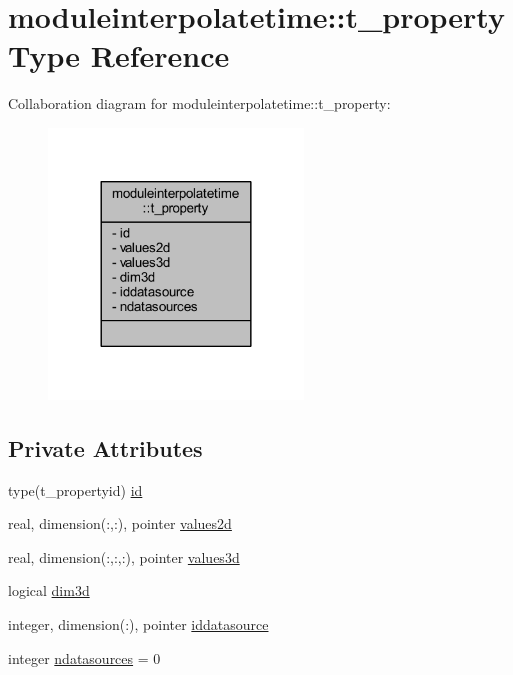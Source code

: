 \hypertarget{structmoduleinterpolatetime_1_1t__property}{}\section{moduleinterpolatetime\+:\+:t\+\_\+property Type Reference}
\label{structmoduleinterpolatetime_1_1t__property}


Collaboration diagram for moduleinterpolatetime\+:\+:t\+\_\+property\+:\nopagebreak
\begin{figure}[H]
\begin{center}
\leavevmode
\includegraphics[width=192pt]{structmoduleinterpolatetime_1_1t__property__coll__graph}
\end{center}
\end{figure}
\subsection*{Private Attributes}
\begin{DoxyCompactItemize}
\item 
type(t\+\_\+propertyid) \mbox{\hyperlink{structmoduleinterpolatetime_1_1t__property_a9667efafac25946f4c15ce9c43508b29}{id}}
\item 
real, dimension(\+:,\+:), pointer \mbox{\hyperlink{structmoduleinterpolatetime_1_1t__property_a3bfc2347a5f7519e8b31870c499d1c87}{values2d}}
\item 
real, dimension(\+:,\+:,\+:), pointer \mbox{\hyperlink{structmoduleinterpolatetime_1_1t__property_a8885ed27bbe9d2cc075c83fef2a3f4df}{values3d}}
\item 
logical \mbox{\hyperlink{structmoduleinterpolatetime_1_1t__property_aaa576d22cc7ec9e727860f93be459429}{dim3d}}
\item 
integer, dimension(\+:), pointer \mbox{\hyperlink{structmoduleinterpolatetime_1_1t__property_aac56c9030ecdd11fe67cb6434d6529fb}{iddatasource}}
\item 
integer \mbox{\hyperlink{structmoduleinterpolatetime_1_1t__property_a4bed4df73037bef17195b086fa5e0fc4}{ndatasources}} = 0
\end{DoxyCompactItemize}


